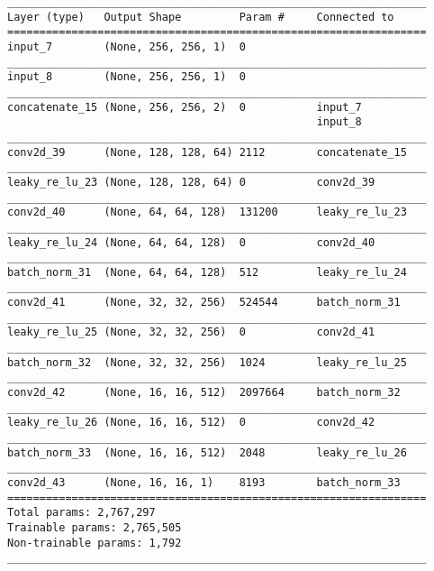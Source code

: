 \begin{verbatim}
_________________________________________________________________
Layer (type)   Output Shape         Param #     Connected to
=================================================================
input_7        (None, 256, 256, 1)  0
_________________________________________________________________
input_8        (None, 256, 256, 1)  0
_________________________________________________________________
concatenate_15 (None, 256, 256, 2)  0           input_7
                                                input_8
_________________________________________________________________
conv2d_39      (None, 128, 128, 64) 2112        concatenate_15
_________________________________________________________________
leaky_re_lu_23 (None, 128, 128, 64) 0           conv2d_39
_________________________________________________________________
conv2d_40      (None, 64, 64, 128)  131200      leaky_re_lu_23
_________________________________________________________________
leaky_re_lu_24 (None, 64, 64, 128)  0           conv2d_40
_________________________________________________________________
batch_norm_31  (None, 64, 64, 128)  512         leaky_re_lu_24
_________________________________________________________________
conv2d_41      (None, 32, 32, 256)  524544      batch_norm_31
_________________________________________________________________
leaky_re_lu_25 (None, 32, 32, 256)  0           conv2d_41
_________________________________________________________________
batch_norm_32  (None, 32, 32, 256)  1024        leaky_re_lu_25
_________________________________________________________________
conv2d_42      (None, 16, 16, 512)  2097664     batch_norm_32
_________________________________________________________________
leaky_re_lu_26 (None, 16, 16, 512)  0           conv2d_42
_________________________________________________________________
batch_norm_33  (None, 16, 16, 512)  2048        leaky_re_lu_26
_________________________________________________________________
conv2d_43      (None, 16, 16, 1)    8193        batch_norm_33
=================================================================
Total params: 2,767,297
Trainable params: 2,765,505
Non-trainable params: 1,792
_________________________________________________________________
\end{verbatim}